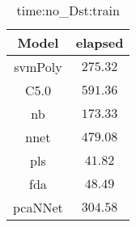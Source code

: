 \begin{table}[!ht]
	\centering
	\begin{tabular}{|c|c|}
		\hline
		Model & elapsed \\ \hline
		svmPoly & $275.32$ \\ \hline
		C5.0 & $591.36$ \\ \hline
		nb & $173.33$ \\ \hline
		nnet & $479.08$ \\ \hline
		pls & $41.82$ \\ \hline
		fda & $48.49$ \\ \hline
		pcaNNet & $304.58$ \\ \hline
	\end{tabular}
	\caption{time:no_Dst:train}
	\label{tab:time:no_Dst:train}
\end{table}
